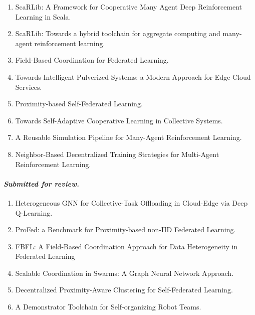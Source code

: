 \documentclass[12pt]{article}
\begin{document}
\begin{enumerate}
	\item ScaRLib: A Framework for Cooperative Many Agent Deep Reinforcement 
	 Learning in Scala.~\cite{DBLP:conf/coordination/DominiCAV23}
	\item ScaRLib: Towards a hybrid toolchain for aggregate computing and many-agent 
	 reinforcement learning.~\cite{DBLP:journals/scp/DominiCAV24}
	\item Field-Based Coordination for Federated Learning.~\cite{DBLP:conf/coordination/DominiAEV24}
	\item Towards Intelligent Pulverized Systems: a Modern Approach 
	 for Edge-Cloud Services.~\cite{DBLP:conf/woa/DominiFAV24}
	\item Proximity-based Self-Federated Learning.~\cite{DBLP:journals/corr/abs-2407-12410}
	\item Towards Self-Adaptive Cooperative Learning in Collective Systems.~\cite{DBLP:conf/acsos/Domini24}
	\item A Reusable Simulation Pipeline for Many-Agent Reinforcement Learning.~\cite{DBLP:conf/dsrt/DominiAPV24}
	\item Neighbor-Based Decentralized Training Strategies for Multi-Agent 
	 Reinforcement Learning.~\cite{DBLP:conf/sac/MalucelliDAV25}
\end{enumerate}

\sloppypar
\paragraph{\emph{Submitted for review.}}
\begin{enumerate}
	\item Heterogeneous GNN for Collective-Task Offloading in Cloud-Edge via Deep
	 Q-Learning.~\cite{DBLP:journals/taas/FarabegoliDAV2025}
	\item ProFed: a Benchmark for Proximity-based non-IID Federated Learning.~\cite{DBLP:conf/ijcnn/DominiAV2025}
	\item FBFL: A Field-Based Coordination Approach for Data Heterogeneity in 
	 Federated Learning~\cite{domini2025fbflfieldbasedcoordinationapproach}
	\item Scalable Coordination in Swarms: A Graph Neural Network Approach.~\cite{DBLP:conf/coordination/VenturiniDAV2025}
	\item Decentralized Proximity-Aware Clustering for Self-Federated Learning.~\cite{DBLP:journals/iot/DominiAFVE2025}
	\item A Demonstrator Toolchain for Self-organizing Robot Teams.~\cite{DBLP:conf/coordination/AguzziNDR25} 
\end{enumerate}


\end{document}
